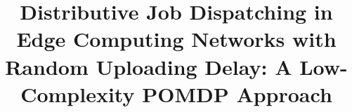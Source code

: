 \documentclass[conference]{IEEEtran}
\theoremstyle{definition}             %
\theoremstyle{remark}                 %
\theoremstyle{plain}                  %
\begin{document}
    \title{Distributive Job Dispatching in Edge Computing Networks with Random Uploading Delay: A Low-Complexity POMDP Approach}

    \author{

      \and
      

      \and


      \and 


      \and 


      \and

    }
\end{document}
